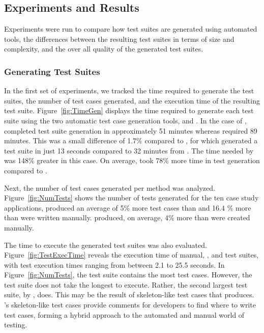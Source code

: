 \subsection{Experiments and Results}
Experiments were run to compare how test suites are generated using automated tools, the differences between the resulting test suites in terms of size and complexity, and the over all quality of the generated test suites.  

\subsubsection{Generating Test Suites }
In the first set of experiments, we tracked the time required to generate the test suites, the number of test cases generated, and the execution time of the resulting test suite.  Figure~\ref{fig:TimeGen} displays the time required to generate each test suite using the two automatic test case generation tools, \codepro and \evo.  In the case of \netweaver, \codepro completed test suite generation in approximately 51 minutes whereas \evo required 89 minutes.  This was a small difference of 1.7\% compared to \xisemele, for which \codepro generated a test suite in just 13 seconds compared to 32 minutes from \evo.  The time needed by \evo was 148\% greater in this case.  On average, \evo took 78\% more time in test generation compared to \codepro.

Next, the number of test cases generated per method was analyzed.  Figure~\ref{fig:NumTests} shows the number of tests generated for the ten case study applications, \codepro produced an average of  5\% more test cases than \evo and 16.4 \% more than were written manually.  \evo produced, on average, 4\% more than were created manually. 

The time to execute the generated test suites was also evaluated. Figure~\ref{fig:TestExecTime} reveals the execution time of manual, \evo, and \codepro test suites, with test execution times ranging from between 2.1 to 25.5 seconds. In Figure~\ref{fig:NumTests}, the \netweaver test suite contains the most test cases. However, the \netweaver \codepro test suite does not take the longest to execute.  Rather, the second largest test suite, \jsecurity by \evo, does. This may be the result of skeleton-like test cases that \codepro produces. \codepro's skeleton-like test cases provide comments for developers to find where to write test cases, forming a hybrid approach to the automated and manual world of testing.%

